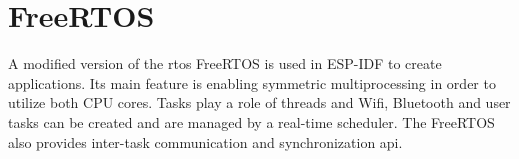 \section{FreeRTOS}

A modified version of the \gls{rtos} FreeRTOS is used in ESP-IDF to create applications. Its main feature is enabling symmetric multiprocessing in order to utilize both CPU cores. Tasks play a role of threads and Wifi, Bluetooth and user tasks can be created and are managed by a real-time scheduler. The FreeRTOS also provides inter-task communication and synchronization \gls{api}.\cite{espidf2022}
